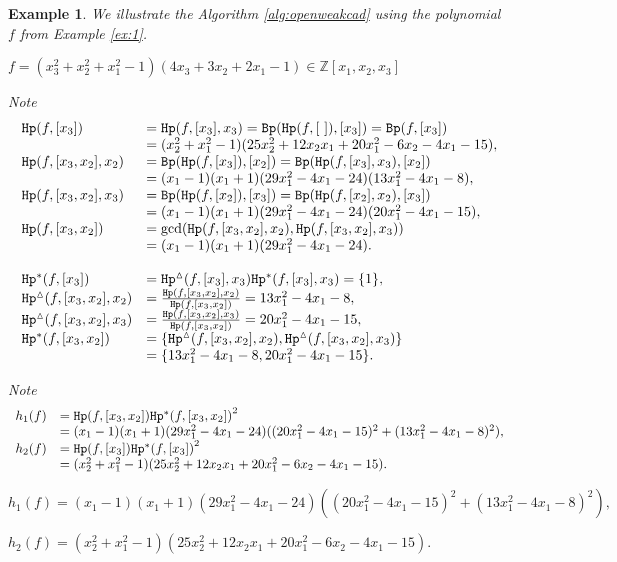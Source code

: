 \documentclass[amsthm]{elsart}
\def \Bproj  {{\tt Bp}}
\def  \Hproj {{\tt Hp}}
\def \ZZ {{\mathbb Z}}
\newtheorem{ex}{Example}   \renewcommand{\algorithmicrequire}{\textsf{Input:}}
\begin{document}
\begin{ex}\label{ex:1-1}We illustrate the Algorithm \ref{alg:openweakcad} using the polynomial $f$ from Example \ref{ex:1}.
\medskip
\begin{description}[leftmargin=3em,style=nextline,itemsep=0.5em]
\item[\sf In:]   $f=(x_3^2+x_2^2+x_1^2-1)(4x_3+3x_2+2x_1-1)\in \ZZ[x_1, x_2,x_3]$

\item[\sf 1:] Note
\[\begin{array}{ll}
\Hproj(f,[x_3])&=\Hproj(f,[x_3],x_3)=\Bproj(\Hproj(f,[~]),[x_3])=\Bproj(f,[x_3])\\
& =(x_2^2+x_1^2-1)(25x_2^2+12x_2x_1+20x_1^2-6x_2-4x_1-15),\\
\Hproj(f,[x_3, x_2],x_2) & =\Bproj(\Hproj(f,[x_3]),[x_2])=\Bproj(\Hproj(f,[x_3],x_3), [x_2])\\
  & = (x_1-1)(x_1+1)(29x_1^2-4x_1-24)(13x_1^2-4x_1-8), \\
\Hproj(f,[x_3, x_2],x_3) & = \Bproj(\Hproj(f,[x_2]),[x_3])=\Bproj(\Hproj(f,[x_2],x_2), [x_3])\\
  & = (x_1-1)(x_1+1)(29x_1^2-4x_1-24)(20x_1^2-4x_1-15),\\
\Hproj(f,[x_3,x_2])&=\gcd(\Hproj(f,[x_3, x_2],x_2),\Hproj(f,[x_3, x_2],x_3))\\
&=(x_1-1)(x_1+1)(29x_1^2-4x_1-24). \\
\\
{\Hproj^{\ast}(f,[x_3])}&={\Hproj^{\vartriangle}(f,[x_3],x_3)}{\Hproj^{\ast}(f,[x_3],x_3)}=\{1\},\\
{\Hproj^{\vartriangle}(f,[x_3,x_2],x_2)}&=\frac{\Hproj(f,[x_3,x_2],x_2)}{\Hproj(f,[x_3,x_2])}=13x_1^2-4x_1-8,\\
{\Hproj^{\vartriangle}(f,[x_3,x_2],x_3)}&=\frac{\Hproj(f,[x_3,x_2],x_3)}{\Hproj(f,[x_3,x_2])}=20x_1^2-4x_1-15,\\
{\Hproj^{\ast}(f,[x_3,x_2])}&=\{{\Hproj^{\vartriangle}(f,[x_3,x_2],x_2)},{\Hproj^{\vartriangle}(f,[x_3,x_2],x_3)}\}\\
&=\{13x_1^2-4x_1-8,20x_1^2-4x_1-15\}.
\end{array}\]
\item[\sf 2:] Note
\[\begin{array}{ll}
h_1(f) &=\Hproj(f,[x_3,x_2]){\Hproj^{\ast}(f,[x_3,x_2])}^2\\
    & =(x_1-1)(x_1+1)(29x_1^2-4x_1-24)((20x_1^2-4x_1-15)^2+(13x_1^2-4x_1-8)^2),\\
h_2(f) &=\Hproj(f,[x_3]){\Hproj^{\ast}(f,[x_3])}^2 \\
    &=(x_2^2+x_1^2-1)(25x_2^2+12x_2x_1+20x_1^2-6x_2-4x_1-15).
\end{array}
\]
\item[\sf Out:]  $h_1(f) =(x_1-1)(x_1+1)(29x_1^2-4x_1-24)((20x_1^2-4x_1-15)^2+(13x_1^2-4x_1-8)^2),$
\item[]          $h_2(f) =(x_2^2+x_1^2-1)(25x_2^2+12x_2x_1+20x_1^2-6x_2-4x_1-15).$
\end{description}
\end{ex}
\end{document}
